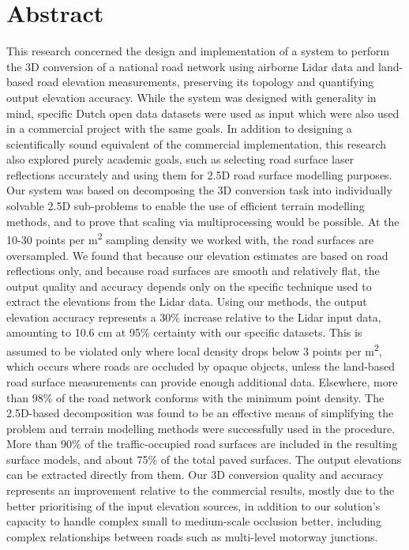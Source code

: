 \chapter*{Abstract}

This research concerned the design and implementation of a system to perform the 3D conversion of a national road network using airborne Lidar data and land-based road elevation measurements, preserving its topology and quantifying output elevation accuracy. While the system was designed with generality in mind, specific Dutch open data datasets were used as input which were also used in a commercial project with the same goals. In addition to designing a scientifically sound equivalent of the commercial implementation, this research also explored purely academic goals, such as selecting road surface laser reflections accurately and using them for 2.5D road surface modelling purposes. Our system was based on decomposing the 3D conversion task into individually solvable 2.5D sub-problems to enable the use of efficient terrain modelling methods, and to prove that scaling via multiprocessing would be possible. At the 10-30 points per m\textsuperscript{2} sampling density we worked with, the road surfaces are oversampled. We found that because our elevation estimates are based on road reflections only, and because road surfaces are smooth and relatively flat, the output quality and accuracy depends only on the specific technique used to extract the elevations from the Lidar data. Using our methods, the output elevation accuracy represents a 30\% increase relative to the Lidar input data, amounting to 10.6 cm at 95\% certainty with our specific datasets. This is assumed to be violated only where local density drops below 3 points per m\textsuperscript{2}, which occurs where roads are occluded by opaque objects, unless the land-based road surface measurements can provide enough additional data. Elsewhere, more than 98\% of the road network conforms with the minimum point density. The 2.5D-based decomposition was found to be an effective means of simplifying the problem and terrain modelling methods were successfully used in the procedure. More than 90\% of the traffic-occupied road surfaces are included in the resulting surface models, and about 75\% of the total paved surfaces. The output elevations can be extracted directly from them. Our 3D conversion quality and accuracy represents an improvement relative to the commercial results, mostly due to the better prioritising of the input elevation sources, in addition to our solution's capacity to handle complex small to medium-scale occlusion better, including complex relationships between roads such as multi-level motorway junctions.